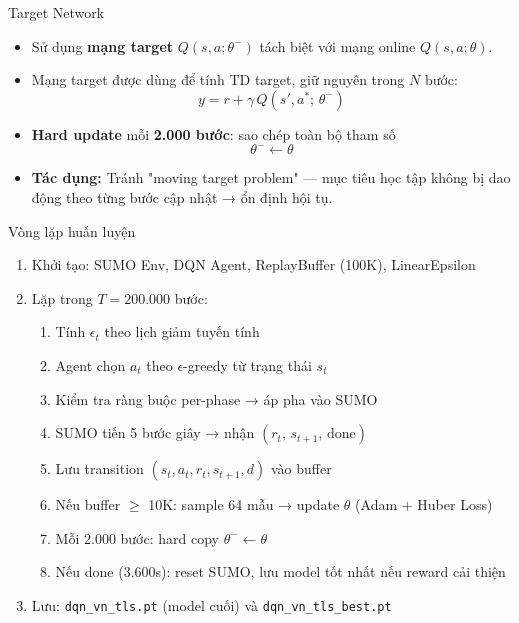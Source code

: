 \begin{frame}{Target Network}
\begin{itemize}
    \item Sử dụng \textbf{mạng target} $Q(s,a;\theta^-)$ tách biệt với mạng online $Q(s,a;\theta)$.
    \item Mạng target được dùng để tính TD target, giữ nguyên trong $N$ bước:
    \[
    y = r + \gamma\, Q(s', a^*;\, \theta^-)
    \]
    \item \textbf{Hard update} mỗi \textbf{2.000 bước}: sao chép toàn bộ tham số
    \[
    \theta^- \leftarrow \theta
    \]
    \item \textbf{Tác dụng:} Tránh "moving target problem" — mục tiêu học tập không bị dao động theo từng bước cập nhật → ổn định hội tụ.
\end{itemize}
\end{frame}

\begin{frame}{Vòng lặp huấn luyện}
\begin{enumerate}
    \item Khởi tạo: SUMO Env, DQN Agent, ReplayBuffer (100K), LinearEpsilon
    \item Lặp trong $T = 200.000$ bước:
    \begin{enumerate}
        \item Tính $\epsilon_t$ theo lịch giảm tuyến tính
        \item Agent chọn $a_t$ theo $\epsilon$-greedy từ trạng thái $s_t$
        \item Kiểm tra ràng buộc per-phase → áp pha vào SUMO
        \item SUMO tiến 5 bước giây → nhận $(r_t,\, s_{t+1},\, \text{done})$
        \item Lưu transition $(s_t, a_t, r_t, s_{t+1}, d)$ vào buffer
        \item Nếu buffer $\geq$ 10K: sample 64 mẫu → update $\theta$ (Adam + Huber Loss)
        \item Mỗi 2.000 bước: hard copy $\theta^- \leftarrow \theta$
        \item Nếu done (3.600s): reset SUMO, lưu model tốt nhất nếu reward cải thiện
    \end{enumerate}
    \item Lưu: \texttt{dqn\_vn\_tls.pt} (model cuối) và \texttt{dqn\_vn\_tls\_best.pt}
\end{enumerate}
\end{frame}


